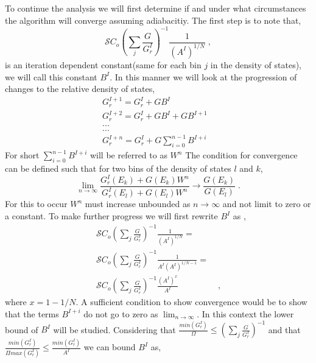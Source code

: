 \documentclass[aps,pre,reprint,superscriptaddress,showkeys]{revtex4-2}
\begin{document}
To continue the analysis we will first determine if and under what circumstances the algorithm will converge assuming adiabacitiy. The first step is to note that, 
\begin{equation}
\mathcal{S}{C_o}(\sum_{j}\frac{G}{G_r^I})^{-1}\frac{1}{(A^I)^{1/N}} \;,
\end{equation}
is an iteration dependent constant(same  for each bin $j$ in the density of states), we will call this constant $B^I$. In this manner we will look at the progression of changes to the relative density of states, 
\begin{equation}
\begin{split}
G_r^{I+1} = G_r^{I} + GB^I\\
G_r^{I+2} = G_r^{I} + GB^I + GB^{I+1} &\\
...&\\
...&\\
G_r^{I+n} = G_r^{I} + G\sum_{i=0}^{n-1}  B^{I+i} &
\end{split}
\label{Gr_IplusN}
\end{equation}
For short $\sum_{i=0}^{n-1}  B^{I+i}$ will be referred to as $W^n$
The condition for convergence can be defined such that for two bins of the density of states $l$ and $k$, 
\begin{equation}
\lim_{n\rightarrow \infty} \frac{G_r^{I}(E_k) + G(E_k)W^n}{G_r^{I}(E_l) + G(E_l)W^n} \rightarrow \frac{G(E_k)}{G(E_l)}\;.
\end{equation}
For this to occur $W^n$ must increase unbounded as $n\rightarrow \infty$ and not limit to zero or a constant. To make further progress we will first rewrite $B^I$ as , 
\begin{equation}
\begin{split}
\mathcal{S}{C_o}(\sum_{j}\frac{G}{G_r^{I}})^{-1}\frac{1}{(A^I)^{1/N}} = \\
\mathcal{S}{C_o}(\sum_{j}\frac{G}{G_r^{I}})^{-1}\frac{1}{A^I(A^I)^{1/N - 1}} = & \\
\mathcal{S}{C_o}(\sum_{j}\frac{G}{G_r^{I}})^{-1}\frac{(A^I)^{x}}{A^I} & \;,
\end{split}
\end{equation}
where $x = 1 - 1/N$. A sufficient condition to show convergence would be to show that the terms $B^{I+i}$ do not go to zero as $\lim_{n \rightarrow \infty}$. In this context the lower bound of $B^I$ will be studied. Considering that $ \frac{min(G_r^{I})}{\Omega} \le (\sum_{j}\frac{G}{G_r^{I}})^{-1}$ and that $\frac{min(G_r^{I})}{\Pi max(G_r^{I})} \le \frac{min(G_r^{I})}{A^I}$ we can bound $B^I$ as, 
\end{document}
